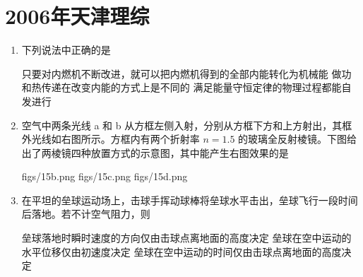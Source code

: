 \documentclass[\gkver]{gaokaozhenti}
\begin{document}
\chapter{2006年天津理综}

\begin{enumerate}
\item
下列说法中正确的是

{只要对内燃机不断改进，就可以把内燃机得到的全部内能转化为机械能}
{做功和热传递在改变内能的方式上是不同的}
{满足能量守恒定律的物理过程都能自发进行}


\item
空气中两条光线 a 和 b 从方框左侧入射，分别从方框下方和上方射出，其框外光线如右图所示。方框内有两个折射率 $n=1.5$ 的玻璃全反射棱镜。下图给出了两棱镜四种放置方式的示意图，其中能产生右图效果的是


{figs/15b.png}
{figs/15c.png}
{figs/15d.png}


\item
在平坦的垒球运动场上，击球手挥动球棒将垒球水平击出，垒球飞行一段时间后落地。若不计空气阻力，则

{垒球落地时瞬时速度的方向仅由击球点离地面的高度决定}
{垒球在空中运动的水平位移仅由初速度决定}
{垒球在空中运动的时间仅由击球点离地面的高度决定}


\end{enumerate}
\end{document}
